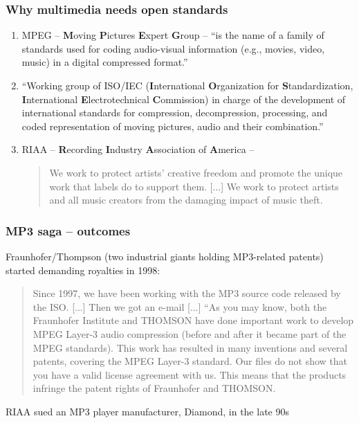 \documentclass{beamer}
\begin{document}
\begin{frame}
	\frametitle{Why multimedia needs open standards}
	\begin{enumerate}
		\item
			MPEG -- \textbf{M}oving \textbf{P}ictures \textbf{E}xpert \textbf{G}roup -- ``is the name of a family of standards used for coding audio-visual information (e.g., movies, video, music) in a digital compressed format.''
		\item
			``Working group of ISO/IEC (\textbf{I}nternational \textbf{O}rganization for \textbf{S}tandardization, \textbf{I}nternational \textbf{E}lectrotechnical \textbf{C}ommission) in charge of the development of international standards for compression, decompression, processing, and coded representation of moving pictures, audio and their combination.''
		\item
			RIAA -- \textbf{R}ecording \textbf{I}ndustry \textbf{A}ssociation of \textbf{A}merica -- 
			\begin{quote}
				We work to protect artists' creative freedom and promote the unique work that labels do to support them. [...] We work to protect artists and all music creators from the damaging impact of music theft. 
			\end{quote}
	\end{enumerate}
\end{frame}

\begin{frame}
	\frametitle{MP3 saga -- outcomes}
	Fraunhofer/Thompson (two industrial giants holding MP3-related patents) started demanding royalties in 1998:
	\begin{quote}
		Since 1997, we have been working with the MP3 source code released by the ISO. [...] Then we got an e-mail [...] ``As you may know, both the Fraunhofer Institute and THOMSON have done important work to develop MPEG Layer-3 audio compression (before and after it became part of the MPEG standards). This work has resulted in many inventions and several patents, covering the MPEG Layer-3 standard. Our files do not show that you have a valid license agreement with us. This means that the products infringe the patent rights of Fraunhofer and THOMSON.
	\end{quote}
	RIAA sued an MP3 player manufacturer, Diamond, in the late 90s
\end{frame}

\end{document}

